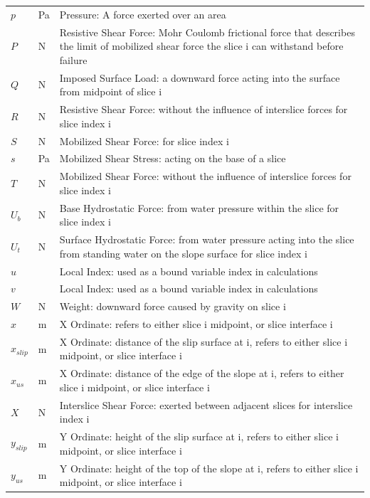 \documentclass[12pt]{article}
\begin{document}
\begin{longtable}{  l  l  p{8.5cm}  }
\\
$p$ & \si{\pascal} & Pressure: A force exerted over an area
\\
$P$ & \si{\newton} & Resistive Shear Force: Mohr Coulomb frictional force that describes the limit of mobilized shear force the slice i can withstand before failure
\\
$Q$ & \si{\newton} & Imposed Surface Load: a downward force acting into the surface from midpoint of slice i
\\
$R$ & \si{\newton} & Resistive Shear Force: without the influence of interslice forces for slice index i
\\
$S$ & \si{\newton} & Mobilized Shear Force: for slice index i
\\
$s$ &\si{\pascal} & Mobilized Shear Stress: acting on the base of a slice
\\
$T$ & \si{\newton} & Mobilized Shear Force: without the influence of interslice forces for slice index i
\\
${U_{b}}$ & \si{\newton} & Base Hydrostatic Force: from water pressure within the slice for slice index i
\\
${U_{t}}$ & \si{\newton} & Surface Hydrostatic Force: from water pressure acting into the slice from standing water on the slope surface for slice index i
\\
$u$ & & Local Index: used as a bound variable index in calculations
\\
$v$ &  &Local Index: used as a bound variable index in calculations
\\
$W$ & \si{\newton} &Weight: downward force caused by gravity on slice i
\\
$x$ & \si{\meter}& X Ordinate: refers to either slice i midpoint, or slice interface i
\\
${x_{slip}}$ &  \si{\meter}&X Ordinate: distance of the slip surface at i, refers to either slice i midpoint, or slice interface i
\\
${x_{us}}$ &  \si{\meter}&X Ordinate: distance of the edge of the slope at i, refers to either slice i midpoint, or slice interface i
\\
$X$ & \si{\newton} & Interslice Shear Force: exerted between adjacent slices for interslice index i
\\
${y_{slip}}$ & \si{\meter}& Y Ordinate: height of the slip surface at i, refers to either slice i midpoint, or slice interface i 
\\
${y_{us}}$ &  \si{\meter}&Y Ordinate: height of the top of the slope at i, refers to either slice i midpoint, or slice interface i 

\end{longtable}
\end{document}
